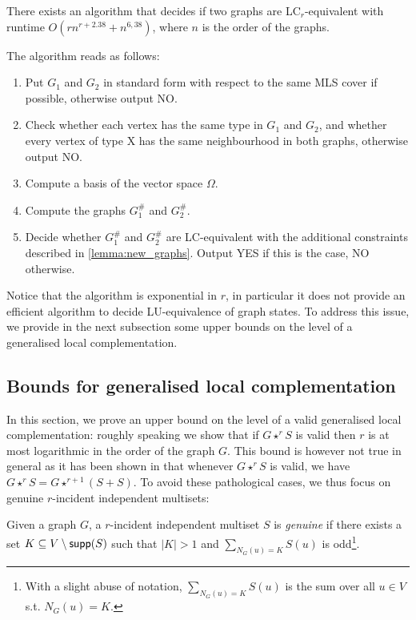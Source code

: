 \documentclass[a4paper,UKenglish,cleveref,autoref,thm-restate]{arxiv}
\newcommand{\se}{\subseteq}
\newcommand{\sm}{\setminus}
\newcommand{\supp}{\textup{\textsf{supp}}}
\begin{document}
\begin{theorem} \label{thm:algolcr}
    There exists an algorithm that decides if two graphs are LC$_r$-equivalent with runtime $O(r n^{r+2.38} + n^{6,38})$, where $n$ is the order of the graphs.
\end{theorem}

The algorithm reads as follows:
\begin{enumerate}
    \item Put $G_1$ and $G_2$ in standard form with respect to the same MLS cover if possible, otherwise output NO.
    \item Check whether each vertex has the same type in $G_1$ and $G_2$, and whether every vertex of type X has the same neighbourhood in both graphs, otherwise output NO.
    \item Compute a basis of the vector space $\Omega$.
    \item Compute the graphs ${G}^{\#}_1$ and ${G}^{\#}_2$.
    \item Decide whether ${G}^{\#}_1$ and ${G}^{\#}_2$ are LC-equivalent with the additional constraints described in \cref{lemma:new_graphs}. Output YES if this is the case,  NO otherwise.
\end{enumerate}


Notice that the algorithm is exponential in $r$, in particular it does not provide an efficient algorithm to decide LU-equivalence of graph states. To address this issue, we provide in the next subsection some upper bounds on the level of a generalised local complementation.


\subsection{Bounds for generalised local complementation} \label{subsec:bounds}


In this section, we prove an upper bound on the level of a valid generalised local complementation: roughly speaking we show that if $G\star^r S$ is valid then $r$ is at most logarithmic in the order of the graph $G$. This bound is however not true in general as it has been shown in \cite{claudet2024local} that whenever $G\star^r S$ is valid, we have $G\star^r S = G\star^{r+1} (S+S)$. To avoid these pathological cases, we thus focus on genuine $r$-incident independent multisets:


\begin{definition}
Given a graph $G$, a $r$-incident independent multiset $S$ is \emph{genuine} if there exists a set $K \se V \sm \supp(S)$ such that $|K|>1$ and $\sum_{N_{G}(u)=K}S(u)$ is odd\footnote{With a slight abuse of notation, $\sum_{N_{G}(u)=K}S(u)$ is the sum over all $u\in V$ s.t. $N_{G}(u)=K$.}. 
\end{definition}
\end{document}

